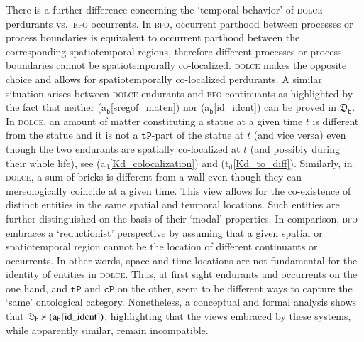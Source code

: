 \documentclass[ao]{iosart2x}
\newcommand{\nb}[1]{\textcolor{red}{$|$}\marginpar{\hspace*{-0cm}\parbox{20mm}{\scriptsize\raggedright\textcolor{red}{#1}}}}
\newcommand{\bfoAxLabel}{\textrm{a$_\texttt{b}$}}
\newcommand{\dolceAxLabel}{\textrm{a$_\texttt{d}$}}
\newcommand{\dolceThrLabel}{\textrm{t$_\texttt{d}$}}
\newcommand{\dbThrLabel}{\textrm{t$_\texttt{db}$}}
\newcommand{\refdolceax}[1]{({\dolceAxLabel}\ref{#1})}
\newcommand{\refdolceth}[1]{({\dolceThrLabel}\ref{#1})}
\newcommand{\refbfoax}[1]{({\bfoAxLabel}\ref{#1})}
\newcommand{\refdbth}[1]{({\dbThrLabel}\ref{#1})}
\newcommand{\pr}[1]{\mathtt{#1}}
\newcommand{\dolce}{{\textsc{dolce}}}
\newcommand{\bfo}{{\textsc{bfo}}}
\newcommand {\thdolcedbmap} {\ensuremath{\mathfrak{D}_\texttt{b}}}
\newcommand {\TPd} {\ensuremath{\pr{tP}}}
\newcommand{\bfocpart}{\pr{cP}}
\newcommand{\bfostregof}{\pr{STREG}}
\begin{document}
There is a further difference concerning the `temporal behavior' of {\dolce} perdurants vs.~{\bfo} occurrents. %
In {\bfo}, occurrent parthood between processes or process boundaries is equivalent to occurrent parthood between the corresponding spatiotemporal regions, therefore different processes or process boundaries cannot be spatiotemporally co-localized. %
{\dolce} makes the opposite choice and allows for spatiotemporally co-localized perdurants. A similar situation arises between {\dolce} endurants and {\bfo} continuants as highlighted by the fact that neither \refbfoax{sregof_maten} nor \refbfoax{id_idcnt} can be proved in $\thdolcedbmap$. %
In {\dolce}, an amount of matter constituting a statue at a given time $t$ is different from the statue and it is not a $\TPd$-part of the statue at $t$ (and vice versa) even though the two endurants are spatially co-localized at $t$ (and possibly during their whole life), see \refdolceax{Kd_colocalization} and \refdolceth{Kd_to_diff}. Similarly, in {\dolce}, a sum of bricks is different from a wall even though they can mereologically coincide at a given time.
This view allows for the co-existence of distinct entities in the same spatial and temporal locations. Such entities are further distinguished on the basis of their `modal' properties. In comparison, {\bfo} embraces a `reductionist' perspective by assuming that a given spatial or spatiotemporal region cannot be the location of different continuants or occurrents. In other words, space and time locations are not fundamental for the identity of entities in {\dolce}. %
Thus, at first sight endurants and occurrents on the one hand, and $\TPd$ and $\bfocpart$ on the other, seem to be different ways to capture the `same' ontological category. Nonetheless, a conceptual and formal analysis shows that ${\thdolcedbmap \nvdash \refbfoax{id_idcnt}}$, highlighting that the views embraced by these systems, while apparently similar, remain incompatible. %
\end{document}
